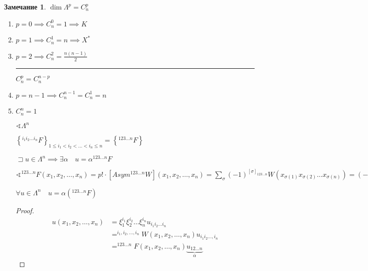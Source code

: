 \documentclass{book}
\theoremstyle{definition}
\newtheorem*{note}{Замечание}
\begin{document}
 \begin{note}
     $\dim \Lambda^p = C_n^p$

      \begin{enumerate}
         \item $p = 0 \implies  C_n^0 = 1 \implies  K$
         \item $p = 1 \implies  C_n^1 = n \implies  X^*$
         \item $p = 2 \implies  C_n^2 = \frac{n(n-1)}{2}$ 
             \\ \hrule
          $C_n^p = C_n^{n-p}$ 
      \item[n] $p = n-1 \implies  C_n^{n-1} = C_n^1 = n$
      \item[n+1] $C_n^n = 1$ 

          $\sphericalangle \Lambda^n$ 

          $\left\{^{i_1 i_2 \ldots i_n}F\right\}_{1\leqslant i_1 < i_2 < \ldots < i _n \leqslant  n} = \left\{ ^{123 \ldots n}F \right\} $ 

          $\sqsupset u\in \Lambda^n \implies  \exists \alpha \quad u = \alpha^{1 2 3 \ldots n}F$

          $\sphericalangle ^{1 2 3\ldots n}F\left( x_1, x_2, \ldots, x_n \right)  = p!\cdot \left[Asym^{1 2 3\ldots n}W\right](x_1, x_2, \ldots, x_n) = \sum_{\sigma} (-1)^{[\sigma]_{1 2 3 \ldots n}}W\left( x_{\sigma(1)} x_{\sigma(2)} \ldots x_{\sigma(n)} \right)  = (-1)^{[\sigma]} \xi_{\sigma(1)}^{1} \xi_{\sigma(2)}^{2} \ldots \xi_{\sigma(n)}^{n} \overset{\triangle}= \det\{x_i\}$ 

          \begin{lemma}
              $\forall u\in \Lambda^n\quad u = \alpha\left( ^{123 \ldots n}F \right) $
          \end{lemma}
          \begin{proof}
              \begin{align*}
                  u\left( x_1, x_2, \ldots, x_n \right) &=  \xi_1^{i_1}\xi_2^{i_2} \ldots \xi_n^{i_n} u_{i_1 i_2 \ldots i_n}\\
                  &= ^{i_1, i_2, \ldots, i_n}W\left( x_1, x_2, \ldots, x_n \right) u_{i_1 i_2\ldots, i_n}\\
                  & = ^{1 2 3 \ldots n}F(x_1, x_2, \ldots, x_n)\underbrace{u_{1 2 \ldots n}}\limits_{\alpha}
              \end{align*}                        
          \end{proof}
  \end{enumerate}


\end{note}
\end{document}
